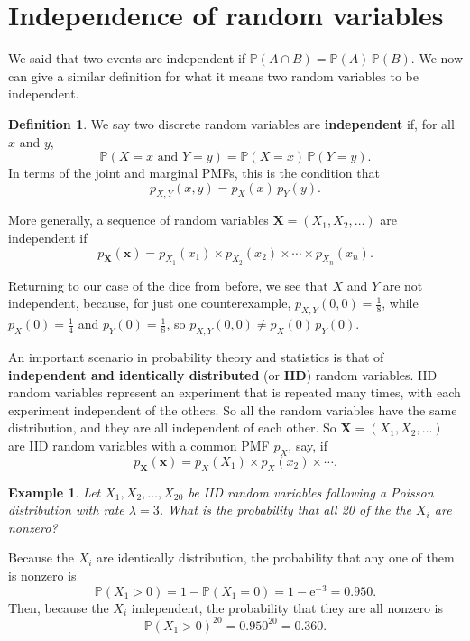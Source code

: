 \documentclass[
  a4paper,
]{book}
\theoremstyle{definition}
\newtheorem{definition}{Definition}[chapter]
\theoremstyle{definition}
\newtheorem{example}{Example}[chapter]
\theoremstyle{definition}
\theoremstyle{definition}
\theoremstyle{remark}
\begin{document}
\hypertarget{independence-rv}{%
\section{Independence of random variables}\label{independence-rv}}

We said that two events are independent if \(\mathbb P(A \cap B) = \mathbb P(A)\, \mathbb P(B)\). We now can give a similar definition for what it means two random variables to be independent.

\begin{definition}
We say two discrete random variables are \textbf{independent} if, for all \(x\) and \(y\),
\[ \mathbb P(X = x \text{ and } Y = y) = \mathbb P(X = x) \, \mathbb P(Y = y) . \]
In terms of the joint and marginal PMFs, this is the condition that
\[ p_{X,Y}(x,y) = p_X(x) \, p_Y(y) . \]

More generally, a sequence of random variables \(\mathbf X = (X_1, X_2, \dots)\) are independent if
\[ p_{\mathbf X}(\mathbf x) = p_{X_1}(x_1) \times p_{X_2}(x_2) \times \cdots \times p_{X_n}(x_n). \]
\end{definition}

Returning to our case of the dice from before, we see that \(X\) and \(Y\) are not independent, because, for just one counterexample, \(p_{X,Y}(0,0) = \frac18\), while \(p_X(0) = \frac14\) and \(p_Y(0) = \frac18\), so \(p_{X,Y}(0,0) \neq p_X(0) \, p_Y(0)\).

An important scenario in probability theory and statistics is that of \textbf{independent and identically distributed} (or \textbf{IID}) random variables. IID random variables represent an experiment that is repeated many times, with each experiment independent of the others. So all the random variables have the same distribution, and they are all independent of each other. So \(\mathbf X = (X_1, X_2, \dots )\) are IID random variables with a common PMF \(p_X\), say, if
\[ p_{\mathbf X}(\mathbf x) = p_X(X_1) \times p_X(x_2) \times \cdots . \]

\begin{example}
\emph{Let \(X_1, X_2, \dots, X_{20}\) be IID random variables following a Poisson distribution with rate \(\lambda = 3\). What is the probability that all 20 of the the \(X_i\) are nonzero?}

Because the \(X_i\) are identically distribution, the probability that any one of them is nonzero is
\[ \mathbb P(X_1 > 0) = 1 - \mathbb P(X_1 = 0) = 1 - \mathrm{e}^{-3} = 0.950 . \]
Then, because the \(X_i\) independent, the probability that they are all nonzero is
\[ \mathbb P(X_1 > 0)^{20} = 0.950^{20} = 0.360. \]
\end{example}
\end{document}
